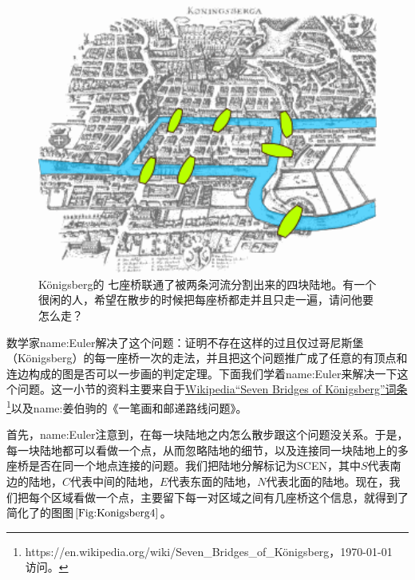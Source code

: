 \documentclass{ctexbook}
\newcommand{\FigLabel}[1]{\label{#1}}
\newcommand{\FigRef}[1]{图$\ref{#1}$}
\begin{document}
\begin{figure}
\includegraphics[width=13cm]{figure/Konigsberg2.png}
\caption[Königsberg 七桥问题]{Königsberg的 七座桥联通了被两条河流分割出来的四块陆地。有一个很闲的人，希望在散步的时候把每座桥都走并且只走一遍，请问他要怎么走？}
\FigLabel{Fig:Konigsberg2}
\end{figure}

数学家\gls{name:Euler}解决了这个问题：证明不存在这样的过且仅过哥尼斯堡（Königsberg）的每一座桥一次的走法，并且把这个问题推广成了任意的有顶点和连边构成的图是否可以一步画的判定定理。下面我们学着\gls{name:Euler}来解决一下这个问题。这一小节的资料主要来自于\href{https://en.wikipedia.org/wiki/Seven\_Bridges\_of\_K\%C3\%B6nigsberg}{Wikipedia“Seven Bridges of Königsberg”词条}\footnote{https://en.wikipedia.org/wiki/Seven\_Bridges\_of\_Königsberg，\today　访问。}以及\gls{name:姜伯驹}的《一笔画和邮递路线问题》\cite{Hua:Collection}。

首先，\gls{name:Euler}注意到，在每一块陆地之内怎么散步跟这个问题没关系。于是，每一块陆地都可以看做一个点，从而忽略陆地的细节，以及连接同一块陆地上的多座桥是否在同一个地点连接的问题。我们把陆地分解标记为SCEN，其中$S$代表南边的陆地，$C$代表中间的陆地，$E$代表东面的陆地，$N$代表北面的陆地。现在，我们把每个区域看做一个点，主要留下每一对区域之间有几座桥这个信息，就得到了简化了的图\FigRef{Fig:Konigsberg4}。
\end{document}
